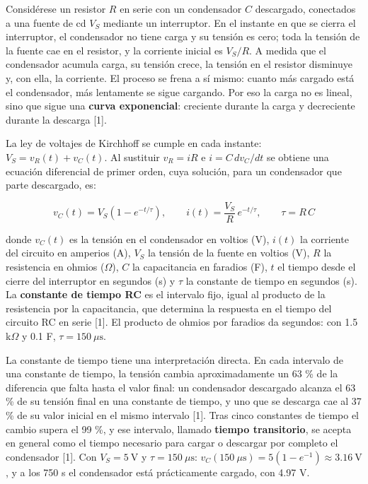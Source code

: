 \documentclass[11pt,letterpaper]{article}
\begin{document}
Considérese un resistor $R$ en serie con un condensador $C$ descargado, conectados a una fuente de cd $V_S$ mediante un interruptor. En el instante en que se cierra el interruptor, el condensador no tiene carga y su tensión es cero; toda la tensión de la fuente cae en el resistor, y la corriente inicial es $V_S/R$. A medida que el condensador acumula carga, su tensión crece, la tensión en el resistor disminuye y, con ella, la corriente. El proceso se frena a sí mismo: cuanto más cargado está el condensador, más lentamente se sigue cargando. Por eso la carga no es lineal, sino que sigue una \textbf{curva exponencial}: creciente durante la carga y decreciente durante la descarga [1].

La ley de voltajes de Kirchhoff se cumple en cada instante: $V_S = v_R(t) + v_C(t)$. Al sustituir $v_R = iR$ e $i = C\,dv_C/dt$ se obtiene una ecuación diferencial de primer orden, cuya solución, para un condensador que parte descargado, es:

\begin{equation}
  v_C(t) = V_S\left(1 - e^{-t/\tau}\right), \qquad i(t) = \frac{V_S}{R}\,e^{-t/\tau}, \qquad \tau = R\,C
\end{equation}

donde $v_C(t)$ es la tensión en el condensador en voltios (V), $i(t)$ la corriente del circuito en amperios (A), $V_S$ la tensión de la fuente en voltios (V), $R$ la resistencia en ohmios (\ensuremath{\Omega}), $C$ la capacitancia en faradios (F), $t$ el tiempo desde el cierre del interruptor en segundos (s) y $\tau$ la constante de tiempo en segundos (s). La \textbf{constante de tiempo RC} es el intervalo fijo, igual al producto de la resistencia por la capacitancia, que determina la respuesta en el tiempo del circuito RC en serie [1]. El producto de ohmios por faradios da segundos: con 1.5 k\ensuremath{\Omega} y 0.1 \textmu{}F, $\tau = 150\ \mu\text{s}$.

La constante de tiempo tiene una interpretación directa. En cada intervalo de una constante de tiempo, la tensión cambia aproximadamente un 63 \% de la diferencia que falta hasta el valor final: un condensador descargado alcanza el 63 \% de su tensión final en una constante de tiempo, y uno que se descarga cae al 37 \% de su valor inicial en el mismo intervalo [1]. Tras cinco constantes de tiempo el cambio supera el 99 \%, y ese intervalo, llamado \textbf{tiempo transitorio}, se acepta en general como el tiempo necesario para cargar o descargar por completo el condensador [1]. Con $V_S = 5\ \text{V}$ y $\tau = 150\ \mu\text{s}$: $v_C(150\ \mu\text{s}) = 5(1 - e^{-1}) \approx 3.16\ \text{V}$, y a los 750 \textmu{}s el condensador está prácticamente cargado, con 4.97 V.
\end{document}
